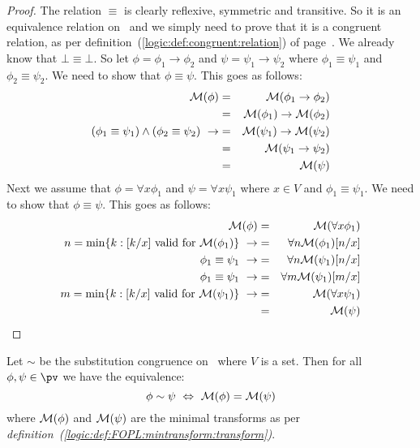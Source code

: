\begin{proof}
The relation $\equiv$ is clearly reflexive, symmetric and
transitive. So it is an equivalence relation on \pv\ and we simply
need to prove that it is a congruent relation, as per
definition~(\ref{logic:def:congruent:relation}) of
page~\pageref{logic:def:congruent:relation}. We already know that
$\bot\equiv\bot$. So let $\phi=\phi_{1}\to\phi_{2}$ and
$\psi=\psi_{1}\to\psi_{2}$ where $\phi_{1}\equiv\psi_{1}$ and
$\phi_{2}\equiv\psi_{2}$. We need to show that $\phi\equiv\psi$.
This goes as follows:
    \begin{eqnarray*}
    {\cal M}(\phi)&=&{\cal M}(\phi_{1}\to\phi_{2})\\
    &=&{\cal M}(\phi_{1})\to{\cal M}(\phi_{2})\\
    (\phi_{1}\equiv\psi_{1})\land(\phi_{2}\equiv\psi_{2})\ \rightarrow
    &=&{\cal M}(\psi_{1})\to{\cal M}(\psi_{2})\\
    &=&{\cal M}(\psi_{1}\to\psi_{2})\\
    &=&{\cal M}(\psi)
    \end{eqnarray*}
Next we assume that $\phi=\forall x\phi_{1}$ and $\psi=\forall
x\psi_{1}$ where $x\in V$ and $\phi_{1}\equiv\psi_{1}$. We need to
show that $\phi\equiv\psi$. This goes as follows:
    \begin{eqnarray*}
    {\cal M}(\phi)&=&{\cal M}(\forall x\phi_{1})\\
    \mbox{$n=\min\{k:[k/x]\mbox{ valid for }{\cal M}(\phi_{1})\}$}\
    \rightarrow&=&\forall n{\cal M}(\phi_{1})[n/x]\\
    \phi_{1}\equiv\psi_{1}\ \rightarrow&=&\forall n{\cal M}(\psi_{1})[n/x]\\
    \phi_{1}\equiv\psi_{1}\ \rightarrow&=&\forall m{\cal M}(\psi_{1})[m/x]\\
    \mbox{$m=\min\{k:[k/x]\mbox{ valid for }{\cal M}(\psi_{1})\}$}\
    \rightarrow&=&{\cal M}(\forall x\psi_{1})\\
    &=&{\cal M}(\psi)
    \end{eqnarray*}
\end{proof}
\begin{theorem}\label{logic:the:FOPL:mintransfsubcong:kernel}
Let $\sim$ be the substitution congruence on \pv\ where $V$ is a
set. Then for all $\phi,\psi\in\pv$ we have the equivalence:
    \[
    \phi\sim\psi\ \Leftrightarrow\ {\cal M}(\phi)={\cal M}(\psi)
    \]
where ${\cal M}(\phi)$ and ${\cal M}(\psi)$ are the minimal
transforms as per {\em
definition~(\ref{logic:def:FOPL:mintransform:transform})}.
\end{theorem}
